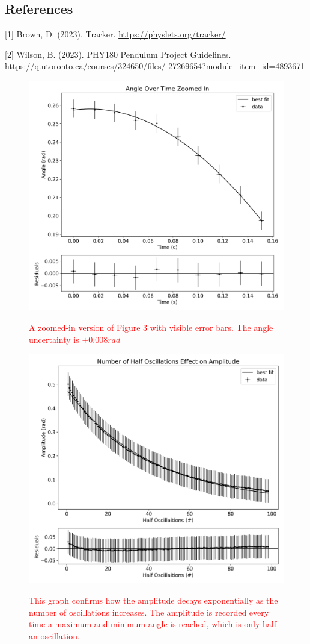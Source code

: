 \documentclass[12pt,twocolumn]{article}
\begin{document}
\subsection*{References}

[1] Brown, D. (2023). Tracker.
\url{https://physlets.org/tracker/}

[2] Wilson, B. (2023). PHY180
Pendulum Project Guidelines.
\url{https://q.utoronto.ca/courses/324650/files/
27269654?module_item_id=4893671}

\begin{figure}[!h]
\begin{centering}
\includegraphics[width=0.5 \textwidth]{images/Angle Over Time Zoomed In.png}
\label{fig:Zoomed}
\caption{\textcolor{red}{A zoomed-in version of Figure 3
with visible error bars. The angle uncertainty is $\pm 0.008rad$}}
\end{centering}
\end{figure}

\begin{figure}[!h]
\begin{centering}
\includegraphics[width=0.5 \textwidth]{images/Number of Half Oscillations Effect on Amplitude.png}
\label{fig:Oscillations}
\caption{\textcolor{red}{This graph confirms how the amplitude decays exponentially as the number
of oscillations increases. The amplitude is
recorded every time a maximum and minimum angle is reached, which is only half an
oscillation.}}
\end{centering}
\end{figure}
\end{document}
